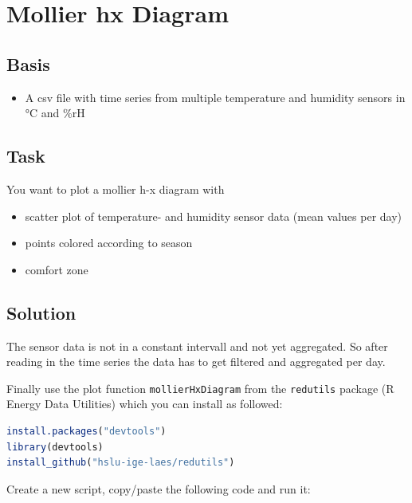 \documentclass[
]{book}
\newcommand{\passthrough}[1]{#1}
\providecommand{\tightlist}{%
  \setlength{\itemsep}{0pt}\setlength{\parskip}{0pt}}
\begin{document}
\hypertarget{mollier-hx-diagram}{%
\section{Mollier hx Diagram}\label{mollier-hx-diagram}}

\hypertarget{basis-1}{%
\subsection{Basis}\label{basis-1}}

\begin{itemize}
\tightlist
\item
  A csv file with time series from multiple temperature and humidity sensors in °C and \%rH
\end{itemize}

\hypertarget{task-1}{%
\subsection{Task}\label{task-1}}

You want to plot a mollier h-x diagram with

\begin{itemize}
\item
  scatter plot of temperature- and humidity sensor data (mean values per day)
\item
  points colored according to season
\item
  comfort zone
\end{itemize}

\hypertarget{solution-1}{%
\subsection{Solution}\label{solution-1}}

The sensor data is not in a constant intervall and not yet aggregated. So after reading in the time series the data has to get filtered and aggregated per day.

Finally use the plot function \passthrough{\lstinline!mollierHxDiagram!} from the \passthrough{\lstinline!redutils!} package (R Energy Data Utilities) which you can install as followed:

\begin{lstlisting}[language=R]
install.packages("devtools")
library(devtools)
install_github("hslu-ige-laes/redutils")
\end{lstlisting}

Create a new script, copy/paste the following code and run it:
\end{document}
